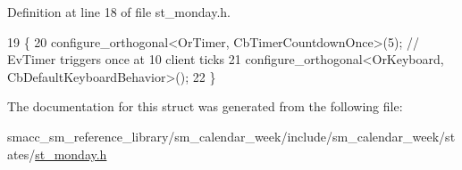 Definition at line 18 of file st\+\_\+monday.\+h.


\begin{DoxyCode}
19     \{
20         configure\_orthogonal<OrTimer, CbTimerCountdownOnce>(5); \textcolor{comment}{// EvTimer triggers once at 10 client ticks}
21         configure\_orthogonal<OrKeyboard, CbDefaultKeyboardBehavior>();
22     \}
\end{DoxyCode}


The documentation for this struct was generated from the following file\+:\begin{DoxyCompactItemize}
\item 
smacc\+\_\+sm\+\_\+reference\+\_\+library/sm\+\_\+calendar\+\_\+week/include/sm\+\_\+calendar\+\_\+week/states/\hyperlink{st__monday_8h}{st\+\_\+monday.\+h}\end{DoxyCompactItemize}
